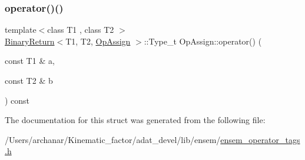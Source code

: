 \mbox{\label{structOpAssign_a1fec7678b3c8924f7bac6a4feb4eb3d0}} 
\subsubsection{\texorpdfstring{operator()()}{operator()()}\hspace{0.1cm}{\footnotesize\ttfamily [2/2]}}
{\footnotesize\ttfamily template$<$class T1 , class T2 $>$ \\
\mbox{\hyperlink{structBinaryReturn}{Binary\+Return}}$<$T1, T2, \mbox{\hyperlink{structOpAssign}{Op\+Assign}} $>$\+::Type\+\_\+t Op\+Assign\+::operator() (\begin{DoxyParamCaption}\item[{const T1 \&}]{a,  }\item[{const T2 \&}]{b }\end{DoxyParamCaption}) const\hspace{0.3cm}{\ttfamily [inline]}}



The documentation for this struct was generated from the following file\+:\begin{DoxyCompactItemize}
\item 
/\+Users/archanar/\+Kinematic\+\_\+factor/adat\+\_\+devel/lib/ensem/\mbox{\hyperlink{lib_2ensem_2ensem__operator__tags_8h}{ensem\+\_\+operator\+\_\+tags.\+h}}\end{DoxyCompactItemize}
